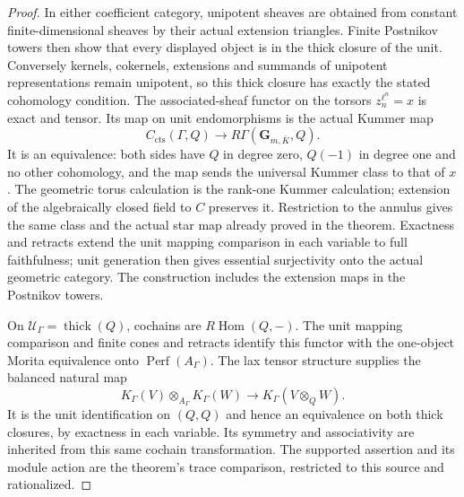 \documentclass[11pt]{article}
\theoremstyle{definition}
\theoremstyle{remark}
\begin{document}
\begin{proof}
In either coefficient category, unipotent sheaves are obtained from
constant finite-dimensional sheaves by their actual extension triangles.
Finite Postnikov towers then show that every displayed object is in
the thick closure of the unit.  Conversely kernels, cokernels,
extensions and summands of unipotent representations remain unipotent,
so this thick closure has exactly the stated cohomology condition.
The associated-sheaf functor on the torsors $z_n^{\ell^n}=x$ is exact
and tensor.  Its map on unit endomorphisms is the actual Kummer map
\[
 C_{\mathrm{cts}}(\Gamma,Q)\longrightarrow
 R\Gamma(\mathbf G_{m,\bar K},Q).
\]
It is an equivalence: both sides have $Q$ in degree zero,
$Q(-1)$ in degree one and no other cohomology, and the map sends
the universal Kummer class to that of $x$.  The geometric torus
calculation is the rank-one Kummer calculation; extension of the
algebraically closed field to $C$ preserves it.  Restriction to the
annulus gives the same class and the actual star map already proved
in the theorem.  Exactness and retracts extend the unit mapping
comparison in each variable to full faithfulness; unit generation
then gives essential surjectivity onto the actual geometric category.
The construction includes the extension maps in the Postnikov towers.

On $\mathcal U_\Gamma=\operatorname{thick}(Q)$, cochains are
$R\operatorname{Hom}(Q,-)$.  The unit mapping comparison and finite
cones and retracts identify this functor with the one-object Morita
equivalence onto $\operatorname{Perf}(A_\Gamma)$.
The lax tensor structure supplies the balanced natural map
\[
 K_\Gamma(V)\otimes_{A_\Gamma}K_\Gamma(W)
       \longrightarrow K_\Gamma(V\otimes_Q W).
\]
It is the unit identification on $(Q,Q)$ and hence an equivalence
on both thick closures, by exactness in each variable.  Its symmetry
and associativity are inherited from this same cochain transformation.
The supported assertion and its module action are the theorem's
trace comparison, restricted to this source and rationalized.
\end{proof}
\end{document}
